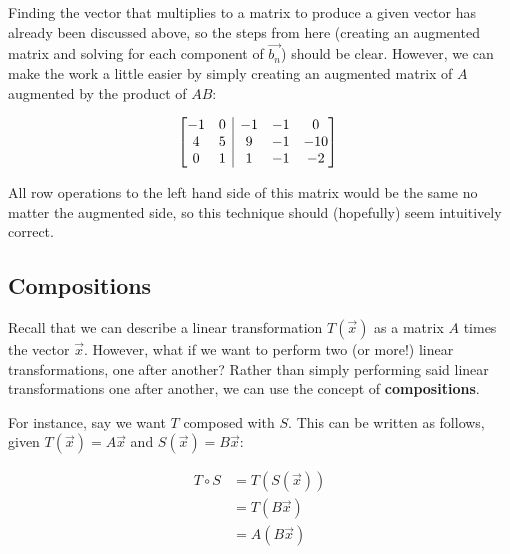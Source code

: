 \documentclass[12pt]{article}
\begin{document}
\begin{itemize}
    Finding the vector that multiplies to a matrix to produce a given vector has already been discussed above, so the steps from here (creating an augmented matrix and solving for each component of $\vec{b_n}$) should be clear. However, we can make the work a little easier by simply creating an augmented matrix of $A$ augmented by the product of $AB$:
    
    \begin{equation}
        \begin{split}
             \begin{array}[t][{@{}cc|ccc@{}}]
                 -1 & 0 & -1 & -1 & 0 \\
                 4 & 5 & 9 & -1 & -10 \\
                 0 & 1 & 1 & -1 & -2 \\
                \end{array}\
        \end{split}
    \end{equation}
    
    All row operations to the left hand side of this matrix would be the same no matter the augmented side, so this technique should (hopefully) seem intuitively correct.
\end{itemize}

\subsection{Compositions}

Recall that we can describe a linear transformation $T(\vec{x})$ as a matrix $A$ times the vector $\vec{x}$. However, what if we want to perform two (or more!) linear transformations, one after another? Rather than simply performing said linear transformations one after another, we can use the concept of \textbf{compositions}.

For instance, say we want $T$ composed with $S$. This can be written as follows, given $T(\vec{x}) = A\vec{x}$ and $S(\vec{x}) = B\vec{x}$:

\begin{equation}
    \begin{split}
        T \circ S &= T(S(\vec{x}))\\
        &= T(B\vec{x})\\
        &= A(B\vec{x})\\
    \end{split}
\end{equation}
\end{document}
